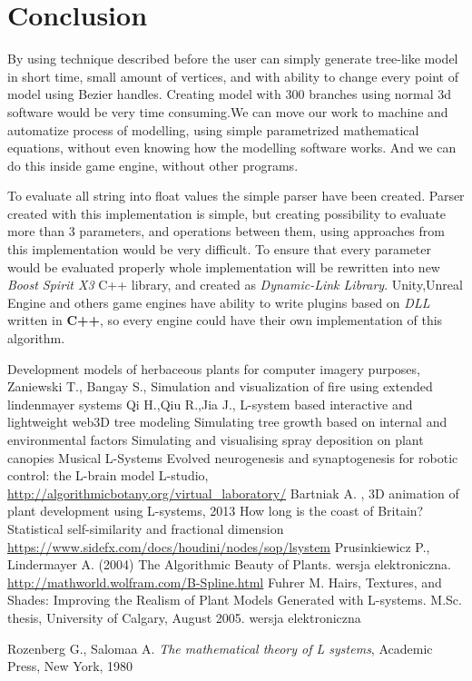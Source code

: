 \documentclass[b5paper,twoside,11pt]{article}
\begin{document}
\section{Conclusion}
By using technique described before the user can simply generate tree-like model in short time, small amount of vertices, and with ability to change every point of model using Bezier handles. Creating model with 300 branches using normal 3d  software would be very time consuming.We can move our work to machine and automatize process of modelling, using simple parametrized mathematical equations, without even knowing how the modelling software works. And we can do this inside game engine, without other programs.

To evaluate all string into float values the simple parser have been created.
Parser created with this implementation is simple, but creating possibility to evaluate more than 3 parameters, and operations between them, using approaches from this implementation would be very difficult. To ensure that every parameter would be evaluated properly whole implementation will be rewritten into new \textit{Boost Spirit X3} C++ library, and created as \textit{Dynamic-Link Library}. Unity,Unreal Engine and others game engines have ability to write plugins based on \textit{DLL} written in \textbf{C++}, so every engine could have their own implementation of this algorithm.


\begin{thebibliography}{99}
Development models of herbaceous plants for computer imagery purposes, 
 Zaniewski T., Bangay S., Simulation and visualization of fire using extended lindenmayer systems
Qi H.,Qiu R.,Jia J., L-system based interactive and lightweight web3D tree modeling
 Simulating tree growth based on internal and environmental factors
Simulating and visualising spray deposition on plant canopies
Musical L-Systems
Evolved neurogenesis and synaptogenesis for robotic control: the L-brain model
L-studio, \url{http://algorithmicbotany.org/virtual_laboratory/}
Bartniak A. , 3D animation of plant development using L-systems, 2013
How long is the coast of Britain? Statistical self-similarity and fractional dimension 
\url{https://www.sidefx.com/docs/houdini/nodes/sop/lsystem}
Prusinkiewicz P., Lindermayer A. (2004) The Algorithmic Beauty of Plants.  wersja elektroniczna.
\url{http://mathworld.wolfram.com/B-Spline.html}
Fuhrer M. Hairs, Textures, and Shades: Improving the Realism of Plant Models Generated with L-systems. M.Sc. thesis, University of Calgary, August 2005. wersja elektroniczna





 Rozenberg G., Salomaa A. \textit{The mathematical theory of L systems}, Academic Press, New York, 1980

\end{thebibliography}

\ifdefined\PROCINCLUDED
%
\else
\end{document}
